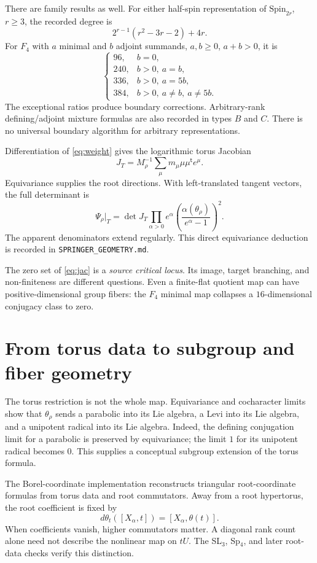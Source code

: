 \documentclass[11pt]{article}
\newcommand{\record}[1]{{\small\nolinkurl{#1}}}
\begin{document}
There are family results as well. For either half-spin representation of $\mathrm{Spin}_{2r}$, $r\ge3$, the recorded degree is
\[
 2^{r-1}(r^2-3r-2)+4r.
\]
For $F_4$ with $a$ minimal and $b$ adjoint summands, $a,b\ge0$, $a+b>0$, it is
\[
 \begin{cases}
 96,&b=0,\\
 240,&b>0,\ a=b,\\
 336,&b>0,\ a=5b,\\
 384,&b>0,\ a\ne b,\ a\ne5b.
 \end{cases}
\]
The exceptional ratios produce boundary corrections. Arbitrary-rank defining/adjoint mixture formulas are also recorded in types $B$ and $C$. There is no universal boundary algorithm for arbitrary representations.

Differentiation of \eqref{eq:weight} gives the logarithmic torus Jacobian
\[
 J_T=M_\rho^{-1}\sum_\mu m_\mu\mu\mu^{\mathsf t}e^\mu.
\]
Equivariance supplies the root directions. With left-translated tangent vectors, the full determinant is
\begin{equation}\label{eq:jac}
 \Psi_\rho|_T=\det J_T
 \prod_{\alpha>0}e^\alpha
 \left(\frac{\alpha(\theta_\rho)}{e^\alpha-1}\right)^2.
\end{equation}
The apparent denominators extend regularly. This direct equivariance deduction is recorded in \record{SPRINGER_GEOMETRY.md}.

The zero set of \eqref{eq:jac} is a \emph{source critical locus}. Its image, target branching, and non-finiteness are different questions. Even a finite-flat quotient map can have positive-dimensional group fibers: the $F_4$ minimal map collapses a $16$-dimensional conjugacy class to zero.

\section{From torus data to subgroup and fiber geometry}

The torus restriction is not the whole map. Equivariance and cocharacter limits show that $\theta_\rho$ sends a parabolic into its Lie algebra, a Levi into its Lie algebra, and a unipotent radical into its Lie algebra. Indeed, the defining conjugation limit for a parabolic is preserved by equivariance; the limit $1$ for its unipotent radical becomes $0$. This supplies a conceptual subgroup extension of the torus formula.

The Borel-coordinate implementation reconstructs triangular root-coordinate formulas from torus data and root commutators. Away from a root hypertorus, the root coefficient is fixed by
\[
 d\theta_t([X_\alpha,t])=[X_\alpha,\theta(t)].
\]
When coefficients vanish, higher commutators matter. A diagonal rank count alone need not describe the nonlinear map on $tU$. The SL$_3$, Sp$_4$, and later root-data checks verify this distinction.
\end{document}
